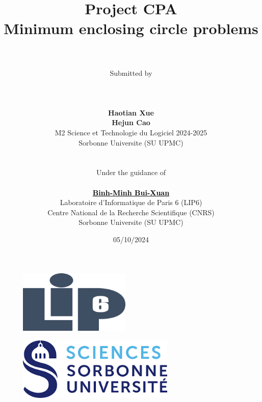 \documentclass[11pt,english]{article}
\begin{document}
\title
{
    \textbf{Project CPA \\ Minimum enclosing circle problems\\}
}

\author
{
    \\
    \\
    Submitted by
    \\
    \\
    \\
    \\
    \textbf{Haotian Xue}
    \\
    \textbf{Hejun Cao}
    \\
    M2 Science et Technologie du Logiciel 2024-2025
    \\
    Sorbonne Universite (SU UPMC)
    \\
    \\
    \\
    Under the guidance of 
    \\
    \\
    \textbf{\href{https://www-npa.lip6.fr/~buixuan/}{\textcolor{black}{Binh-Minh Bui-Xuan}}}
    \\
    Laboratoire d'Informatique de Paris 6 (LIP6)
    \\
    Centre National de la Recherche Scientifique (CNRS)
    \\
    Sorbonne Universite (SU UPMC)
}

\date{05/10/2024}

\maketitle

\begin{figure}[htbp]
    \begin{center}
        \includegraphics[height=3cm]{./src/logo_lip6.png}
    \end{center}
\end{figure}

\begin{figure}[htbp]
    \begin{center}
        \includegraphics[height=3cm]{./src/Science_Sorbonne_logo.png}
    \end{center}
\end{figure}
\end{document}
